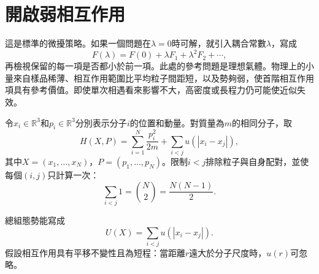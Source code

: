 \section{開啟弱相互作用}

\begin{classroomqa}
\end{classroomqa}

這是標準的微擾策略。如果一個問題在\(\lambda=0\)時可解，就引入耦合常數\(\lambda\)，寫成
\begin{equation}
 F(\lambda)=F(0)+\lambda F_1+\lambda^2F_2+\cdots,
 \label{eq:sm6-perturbative-template}
\end{equation}
再檢視保留的每一項是否都小於前一項。此處的參考問題是理想氣體。物理上的小量來自樣品稀薄、相互作用範圍比平均粒子間距短，以及勢夠弱，使首階相互作用項具有參考價值。即使單次相遇看來影響不大，高密度或長程力仍可能使近似失效。

令\(x_i\in\mathbb R^3\)和\(p_i\in\mathbb R^3\)分別表示分子\(i\)的位置和動量。對質量為\(m\)的相同分子，取
\begin{equation}
 H(X,P)=
 \sum_{i=1}^{N}\frac{p_i^2}{2m}
 +\sum_{i<j}u\!\left(|x_i-x_j|\right),
 \label{eq:sm6-interacting-hamiltonian}
\end{equation}
其中\(X=(x_1,\ldots,x_N)\)，\(P=(p_1,\ldots,p_N)\)。限制\(i<j\)排除粒子與自身配對，並使每個\((i,j)\)只計算一次：
\begin{equation}
 \sum_{i<j}1=\binom{N}{2}=\frac{N(N-1)}{2}.
 \label{eq:sm6-pair-count}
\end{equation}

\begin{classroomqa}
\end{classroomqa}

總組態勢能寫成
\begin{equation}
 U(X)=\sum_{i<j}u\!\left(|x_i-x_j|\right).
 \label{eq:sm6-total-potential}
\end{equation}
假設相互作用具有平移不變性且為短程：當距離\(r\)遠大於分子尺度時，\(u(r)\)可忽略。

